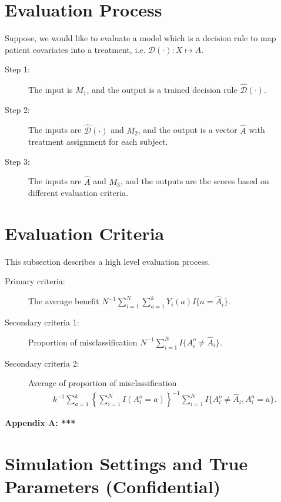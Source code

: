 \documentclass[12pt]{article}
\renewcommand{\theequation} {\arabic{section}.\arabic{equation}}
\def\hat{\widehat}
\def\cal{\mathcal}
\def\calD{{\cal D}} %
\begin{document}
\section{Evaluation Process} \label{sec.EvalProc}

Suppose, we would like to evaluate a model which is a decision rule to map patient covariates into a treatment, i.e. $\calD(\cdot): X \mapsto A$.
\begin{description}
\item[Step 1:] The input is $M_1$, and the output is a trained decision rule $\hat{\calD}(\cdot)$.
\item[Step 2:] The inputs are $\hat{\calD}(\cdot)$ and $M_2$, and the output is a vector $\hat{A}$ with treatment assignment for each subject.
\item[Step 3:] The inputs are $\hat{A}$ and $M_3$, and the outputs are the scores based on different evaluation criteria.
\end{description}

\section{Evaluation Criteria}
This subsection describes a high level evaluation process.



\begin{description}
\item[Primary criteria:]  The average benefit $N^{-1}\sum_{i=1}^{N} \sum_{a=1}^k Y_{i}(a) I\{a=\hat{A}_i\}$.
\item[Secondary criteria 1:] Proportion of misclassification $N^{-1}\sum_{i=1}^{N} I\{A^o_i \neq \hat{A}_i\}$.
\item[Secondary criteria 2:] Average of proportion of misclassification
 \begin{eqnarray*}
k^{-1} \sum_{a=1}^k \left\{\sum_{i=1}^{N} I(A^o_i=a)\right\}^{-1} \sum_{i=1}^{N} I\{A^o_i \neq  \hat{A}_i, A^o_i=a\}.
\end{eqnarray*}
\end{description}








\setcounter{equation}{0}
\renewcommand{\theequation} {A.\arabic{equation}}
\begin{center}
\bf \Large Appendix A: ***
\end{center}

\section*{Simulation Settings and True Parameters (Confidential)} \label{sec.SimSettings}
\end{document}

